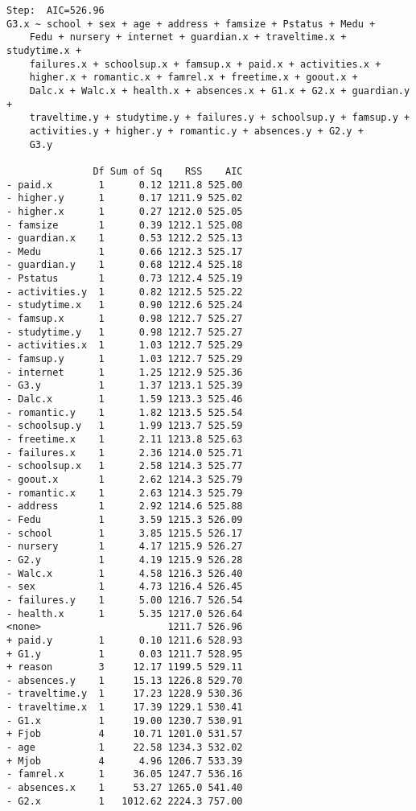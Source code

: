 \documentclass[11pt]{article}
\begin{document}
\begin{enumerate}
\begin{verbatim}
Step:  AIC=526.96
G3.x ~ school + sex + age + address + famsize + Pstatus + Medu + 
    Fedu + nursery + internet + guardian.x + traveltime.x + studytime.x + 
    failures.x + schoolsup.x + famsup.x + paid.x + activities.x + 
    higher.x + romantic.x + famrel.x + freetime.x + goout.x + 
    Dalc.x + Walc.x + health.x + absences.x + G1.x + G2.x + guardian.y + 
    traveltime.y + studytime.y + failures.y + schoolsup.y + famsup.y + 
    activities.y + higher.y + romantic.y + absences.y + G2.y + 
    G3.y

               Df Sum of Sq    RSS    AIC
- paid.x        1      0.12 1211.8 525.00
- higher.y      1      0.17 1211.9 525.02
- higher.x      1      0.27 1212.0 525.05
- famsize       1      0.39 1212.1 525.08
- guardian.x    1      0.53 1212.2 525.13
- Medu          1      0.66 1212.3 525.17
- guardian.y    1      0.68 1212.4 525.18
- Pstatus       1      0.73 1212.4 525.19
- activities.y  1      0.82 1212.5 525.22
- studytime.x   1      0.90 1212.6 525.24
- famsup.x      1      0.98 1212.7 525.27
- studytime.y   1      0.98 1212.7 525.27
- activities.x  1      1.03 1212.7 525.29
- famsup.y      1      1.03 1212.7 525.29
- internet      1      1.25 1212.9 525.36
- G3.y          1      1.37 1213.1 525.39
- Dalc.x        1      1.59 1213.3 525.46
- romantic.y    1      1.82 1213.5 525.54
- schoolsup.y   1      1.99 1213.7 525.59
- freetime.x    1      2.11 1213.8 525.63
- failures.x    1      2.36 1214.0 525.71
- schoolsup.x   1      2.58 1214.3 525.77
- goout.x       1      2.62 1214.3 525.79
- romantic.x    1      2.63 1214.3 525.79
- address       1      2.92 1214.6 525.88
- Fedu          1      3.59 1215.3 526.09
- school        1      3.85 1215.5 526.17
- nursery       1      4.17 1215.9 526.27
- G2.y          1      4.19 1215.9 526.28
- Walc.x        1      4.58 1216.3 526.40
- sex           1      4.73 1216.4 526.45
- failures.y    1      5.00 1216.7 526.54
- health.x      1      5.35 1217.0 526.64
<none>                      1211.7 526.96
+ paid.y        1      0.10 1211.6 528.93
+ G1.y          1      0.03 1211.7 528.95
+ reason        3     12.17 1199.5 529.11
- absences.y    1     15.13 1226.8 529.70
- traveltime.y  1     17.23 1228.9 530.36
- traveltime.x  1     17.39 1229.1 530.41
- G1.x          1     19.00 1230.7 530.91
+ Fjob          4     10.71 1201.0 531.57
- age           1     22.58 1234.3 532.02
+ Mjob          4      4.96 1206.7 533.39
- famrel.x      1     36.05 1247.7 536.16
- absences.x    1     53.27 1265.0 541.40
- G2.x          1   1012.62 2224.3 757.00


\end{verbatim}
\end{enumerate}
\end{document}

